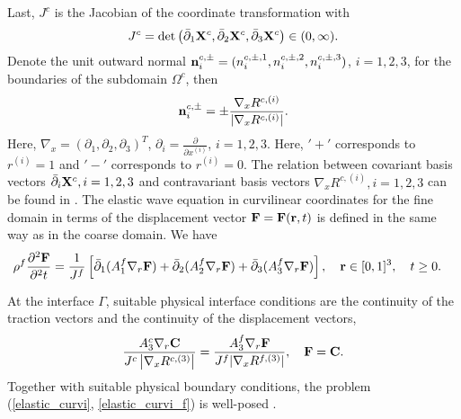 Last, $J^c$ is the Jacobian of the coordinate transformation with
\[J^c = \mbox{det} \left(\bar{\partial}_1 {\bf X}^c, \bar{\partial}_2 {\bf X}^c, \bar{\partial}_3 {\bf X}^c\right)\in (0,\infty).\] 
Denote the unit outward normal ${\bf n}_i^{c,\pm} = (n_i^{c,\pm,1},n_i^{c,\pm,2},n_i^{c,\pm,3})$, $i = 1,2,3$, for the boundaries of the subdomain $\Omega^c$, then
\begin{align}\label{outward_normal}
{\bf n}_i^{c,\pm}  = \pm \frac{\nabla_x R^{c,(i)}}{|\nabla_x R^{c,(i)}|}.
\end{align}
Here, $\nabla_x = (\partial_1, \partial_2, \partial_3)^T$, $\partial_i = \frac{\partial}{\partial
  x^{(i)}}$, $i = 1,2,3$. Here, $'+'$ corresponds to $r^{(i)} = 1$ and $'-'$ corresponds to $r^{(i)}
= 0$. The relation between covariant basis vectors $\bar{\partial}_i {\bf X}^c, i = 1,2,3$ and
contravariant basis vectors $\nabla_x R^{c,(i)}, i = 1,2,3$ can be found in \cite{petersson2015wave,
  thompson1985numerical}. The elastic wave equation in curvilinear coordinates for the fine domain
in terms of the displacement vector ${\bf F} = {\bf F}({\bf r}, t)$ is defined in the same way as in
the coarse domain. We have
\begin{align}\label{elastic_curvi_f}
	\rho^f\frac{\partial^2{\bf F}}{\partial^2 t} &= \frac{1}{J^f}\left[\bar{\partial}_1(A_1^f\nabla_r{\bf F}) + \bar{\partial}_2(A_2^f\nabla_r{\bf F}) + \bar{\partial}_3(A_3^f\nabla_r{\bf F}) \right], \ \ \  {\bf r}\in [0,1]^3,\ \ \  t\geq0.
\end{align}

At the interface $\Gamma$, suitable physical interface conditions are the continuity of the traction vectors and the continuity of the displacement vectors,
\begin{equation}\label{interface_cond}
\frac{A_3^c\nabla_r{\bf C}}{J^c\left|\nabla_x R^{c,(3)}\right|} = \frac{A_3^f\nabla_r{\bf F}}{J^f|\nabla_x R^{f,(3)}|}, \quad {\bf F} = {\bf C}.
\end{equation}
Together with suitable physical boundary conditions, the problem (\ref{elastic_curvi}, \ref{elastic_curvi_f}) is well-posed \cite{duru2014stable, petersson2015wave}.


